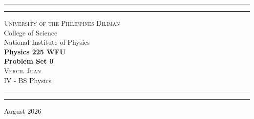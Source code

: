 \begin{titlepage}
    \vspace*{2.5in}
    \hrule
    \vspace{3pt}
    \hrule
    \vspace{0.25in}
    \begin{center}
    {\Large \textsc{
		University of the Philippines Diliman}\\[4pt]
		College of Science\\[4pt]
		National Institute of Physics}\\ \vspace{0.5cm}
		{\Huge\textbf{
			Physics 225 WFU
		\\[5pt]
			Problem Set 0
		}}
		\\[0.5cm]
		{\Large \textsc{
			Vercil Juan
		}}\\[5pt] {\large 
			IV - BS Physics
	}
    \end{center}
    \vspace{0.25in}
    \hrule
    \vspace{3pt}
    \hrule 
    \vfill
    \begin{center}
    {\large 
		August 2026
	}
    \end{center}
\end{titlepage}
